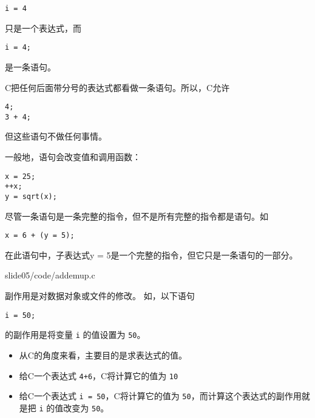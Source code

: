 \begin{frame}[fragile]
\begin{lstlisting}[backgroundcolor=\color{red!10}]
i = 4
\end{lstlisting}
只是一个表达式，而
\begin{lstlisting}[backgroundcolor=\color{red!10}]
i = 4;
\end{lstlisting}
是一条语句。

\end{frame}

\begin{frame}[fragile]
C把任何后面带分号的表达式都看做一条语句。所以，C允许
\begin{lstlisting}[backgroundcolor=\color{red!10}]
4;
3 + 4; 
\end{lstlisting}
但这些语句不做任何事情。
\end{frame}

\begin{frame}[fragile]
一般地，语句会改变值和调用函数：
\begin{lstlisting}[backgroundcolor=\color{red!10}]
x = 25;
++x;
y = sqrt(x); 
\end{lstlisting}
\end{frame}

\begin{frame}[fragile]
尽管一条语句是一条完整的指令，但不是所有完整的指令都是语句。如
\begin{lstlisting}[backgroundcolor=\color{red!10}]
x = 6 + (y = 5); 
\end{lstlisting}
在此语句中，子表达式y = 5是一个完整的指令，但它只是一条语句的一部分。
\end{frame}

\begin{frame}
  
  {slide05/code/addemup.c}
\end{frame}


\begin{frame}[fragile]
  副作用是对数据对象或文件的修改。  如，以下语句
  \begin{lstlisting}[backgroundcolor=\color{red!10}]
i = 50;
\end{lstlisting}
的副作用是将变量 \lstinline|i| 的值设置为 \lstinline|50|。\pause 

 \pause 
\vspace{0.1in} 

\begin{itemize}
\item
从C的角度来看，主要目的是求表达式的值。\\[0.1in]
\item 给C一个表达式 \lstinline|4+6|，C将计算它的值为 \lstinline|10|\\[0.1in]
\item 给C一个表达式 \lstinline|i = 50|，C将计算它的值为 \lstinline|50|，而计算这个表达式的副作用就是把 \lstinline|i| 的值改变为 \lstinline|50|。
\end{itemize}

\end{frame}

